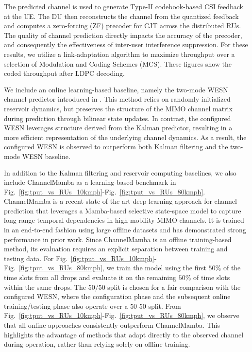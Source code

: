 \documentclass[lettersize,journal]{IEEEtran}
\begin{document}
The predicted channel is used to generate Type-II codebook-based CSI feedback at the UE. The DU then reconstructs the channel from the quantized feedback and computes a zero-forcing (ZF) precoder for CJT across the distributed RUs. 
The quality of channel prediction directly impacts the accuracy of the precoder, and consequently the effectiveness of inter-user interference suppression.
For these results, we utilize a link-adaptation algorithm to maximize throughput over a selection of Modulation and Coding Schemes (MCS).
These figures show the coded throughput after LDPC decoding.

We include an online learning-based baseline, namely the two-mode WESN channel predictor introduced in \cite{wiopt}. 
This method relies on randomly initialized reservoir dynamics, but preserves the structure of the MIMO channel matrix during prediction through bilinear state updates.
In contrast, the configured WESN leverages structure derived from the Kalman predictor, resulting in a more efficient representation of the underlying channel dynamics. 
As a result, the configured WESN is observed to outperform both Kalman filtering and the two-mode WESN baseline.

In addition to the Kalman filtering and reservoir computing baselines, we also include ChannelMamba \cite{channelmamba} as a learning-based benchmark in Fig.~\ref{fig:tput_vs_RUs_10kmph}-Fig.~\ref{fig:tput_vs_RUs_80kmph}. 
ChannelMamba is a recent state-of-the-art deep learning approach for channel prediction that leverages a Mamba-based selective state-space model to capture long-range temporal dependencies in high-mobility MIMO channels. 
It is trained in an end-to-end fashion using large offline datasets and has demonstrated strong performance in prior work.
Since ChannelMamba is an offline training-based method, its evaluation requires an explicit separation between training and testing data. 
For Fig.~\ref{fig:tput_vs_RUs_10kmph}-Fig.~\ref{fig:tput_vs_RUs_80kmph}, we train the model using the first $50\%$ of the time slots from all drops and evaluate it on the remaining $50\%$ of time slots within the same drops. 
The $50/50$ split is chosen for a fair comparison with the configured WESN, where the configuration phase and the subsequent online training/testing phase also operate over a   $50$-$50$ split.
From Fig.~\ref{fig:tput_vs_RUs_10kmph}-Fig.~\ref{fig:tput_vs_RUs_80kmph}, we observe that all online approaches consistently outperform ChannelMamba. 
This highlights the advantage of methods that adapt directly to the observed channel during operation, rather than relying solely on offline training. 
\end{document}
